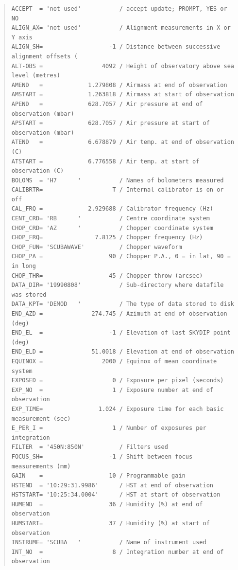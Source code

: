 \documentclass[twoside,11pt]{article}
\newenvironment{myquote}{\begin{quote}\begin{small}}{\end{small}\end{quote}}
\renewcommand{\_}{\texttt{\symbol{95}}}
\begin{document}
\begin{myquote}
\begin{verbatim}
ACCEPT  = 'not used'           / accept update; PROMPT, YES or NO
ALIGN_AX= 'not used'           / Alignment measurements in X or Y axis
ALIGN_SH=                   -1 / Distance between successive alignment offsets (
ALT-OBS =                 4092 / Height of observatory above sea level (metres)
AMEND   =             1.279808 / Airmass at end of observation
AMSTART =             1.263818 / Airmass at start of observation
APEND   =             628.7057 / Air pressure at end of observation (mbar)
APSTART =             628.7057 / Air pressure at start of observation (mbar)
ATEND   =             6.678879 / Air temp. at end of observation (C)
ATSTART =             6.776558 / Air temp. at start of observation (C)
BOLOMS  = 'H7      '           / Names of bolometers measured
CALIBRTR=                    T / Internal calibrator is on or off
CAL_FRQ =             2.929688 / Calibrator frequency (Hz)
CENT_CRD= 'RB      '           / Centre coordinate system
CHOP_CRD= 'AZ      '           / Chopper coordinate system
CHOP_FRQ=               7.8125 / Chopper frequency (Hz)
CHOP_FUN= 'SCUBAWAVE'          / Chopper waveform
CHOP_PA =                   90 / Chopper P.A., 0 = in lat, 90 = in long
CHOP_THR=                   45 / Chopper throw (arcsec)
DATA_DIR= '19990808'           / Sub-directory where datafile was stored
DATA_KPT= 'DEMOD   '           / The type of data stored to disk
END_AZD =              274.745 / Azimuth at end of observation (deg)
END_EL  =                   -1 / Elevation of last SKYDIP point (deg)
END_ELD =              51.0018 / Elevation at end of observation
EQUINOX =                 2000 / Equinox of mean coordinate system
EXPOSED =                    0 / Exposure per pixel (seconds)
EXP_NO  =                    1 / Exposure number at end of observation
EXP_TIME=                1.024 / Exposure time for each basic measurement (sec)
E_PER_I =                    1 / Number of exposures per integration
FILTER  = '450N:850N'          / Filters used
FOCUS_SH=                   -1 / Shift between focus measurements (mm)
GAIN    =                   10 / Programmable gain
HSTEND  = '10:29:31.9986'      / HST at end of observation
HSTSTART= '10:25:34.0004'      / HST at start of observation
HUMEND  =                   36 / Humidity (%) at end of observation
HUMSTART=                   37 / Humidity (%) at start of observation
INSTRUME= 'SCUBA   '           / Name of instrument used
INT_NO  =                    8 / Integration number at end of observation

\end{verbatim}
\end{myquote}
\end{document}
